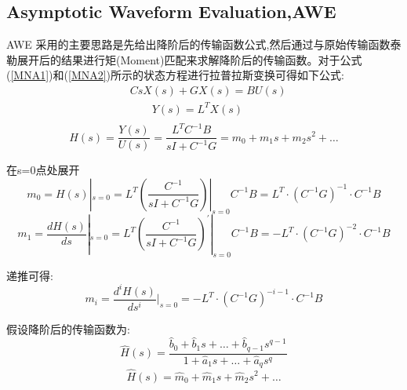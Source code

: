 \documentclass[12pt]{article}
\begin{document}
\begin{sloppypar}
\subsection{Asymptotic Waveform Evaluation,AWE}
\qquad AWE \cite{1}采用的主要思路是先给出降阶后的传输函数公式,然后通过与原始传输函数泰勒展开后的结果进行矩(Moment)匹配来求解降阶后的传输函数。对于公式(\ref{MNA1})和(\ref{MNA2})所示的状态方程进行拉普拉斯变换可得如下公式:
\begin{equation}
  \begin{align}
    & CsX(s) + GX(s) = BU(s) \\
    & \qquad Y(s) = L^TX(s) \\
  \end{align}
\end{equation}
\begin{equation}
  H(s) = \frac{Y(s)}{U(s)} = \frac{L^{T} C^{-1} B}{sI + C^{-1}G} = m_0 + m_{1}s + m_{2}s^{2} + \ldots
\end{equation}

\qquad 在s=0点处展开
\begin{equation}
  m_0=H(s)|_{s=0}=L^{T}\left(\frac{C^{-1}}{sI + C^{-1}G}\right)|_{s=0} C^{-1} B = L^{T} \cdot (C^{-1}G)^{-1} \cdot  C^{-1} B 
\end{equation}
\begin{equation}
  m_1= \frac{dH(s)}{ds} |_{s=0} = L^{T} \left( \frac{C^{-1}}{sI + C^{-1}G} \right)^{'} |_{s=0} C^{-1} B = - L^{T} \cdot (C^{-1}G)^{-2} \cdot C^{-1} B 
\end{equation}

\qquad 递推可得:
\begin{equation}
  m_i=\frac{d^i H(s)}{ds^i}|_{s=0}  = - L^{T} \cdot (C^{-1}G)^{-i-1} \cdot  C^{-1} B 
\end{equation}

\qquad 假设降阶后的传输函数为:
\begin{equation}
  \hat{H}(s)=\frac{\hat{b}_0+\hat{b}_1 s+\ldots+\hat{b}_{q-1} s^{q-1}}{1+\hat{a}_1 s+\ldots+\hat{a}_q s^q}
\end{equation}
\begin{equation}
  \hat{H}(s)=\hat{m}_0 + \hat{m}_1 s  + \hat{m}_2 s^2 + \ldots 
\end{equation}


\end{sloppypar}
\end{document}
